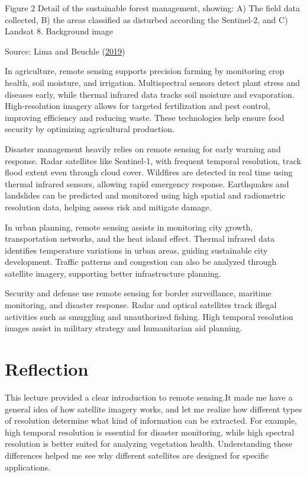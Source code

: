\documentclass[
  letterpaper,
]{scrbook}
\begin{document}
Figure 2 Detail of the sustainable forest management, showing: A) The
field data collected, B) the areas classified as disturbed according the
Sentinel-2, and C) Landsat 8. Background image

Source: Lima and Beuchle
(\href{https://doi.org/10.3390/rs11080961}{2019})

In agriculture, remote sensing supports precision farming by monitoring
crop health, soil moisture, and irrigation. Multispectral sensors detect
plant stress and diseases early, while thermal infrared data tracks soil
moisture and evaporation. High-resolution imagery allows for targeted
fertilization and pest control, improving efficiency and reducing waste.
These technologies help ensure food security by optimizing agricultural
production.

Disaster management heavily relies on remote sensing for early warning
and response. Radar satellites like Sentinel-1, with frequent temporal
resolution, track flood extent even through cloud cover. Wildfires are
detected in real time using thermal infrared sensors, allowing rapid
emergency response. Earthquakes and landslides can be predicted and
monitored using high spatial and radiometric resolution data, helping
assess risk and mitigate damage.

In urban planning, remote sensing assists in monitoring city growth,
transportation networks, and the heat island effect. Thermal infrared
data identifies temperature variations in urban areas, guiding
sustainable city development. Traffic patterns and congestion can also
be analyzed through satellite imagery, supporting better infrastructure
planning.

Security and defense use remote sensing for border surveillance,
maritime monitoring, and disaster response. Radar and optical satellites
track illegal activities such as smuggling and unauthorized fishing.
High temporal resolution images assist in military strategy and
humanitarian aid planning.

\section{Reflection}\label{reflection}

This lecture provided a clear introduction to remote sensing.It made me
have a general idea of how satellite imagery works, and let me realize
how different types of resolution determine what kind of information can
be extracted. For example, high temporal resolution is essential for
disaster monitoring, while high spectral resolution is better suited for
analyzing vegetation health. Understanding these differences helped me
see why different satellites are designed for specific applications.
\end{document}
